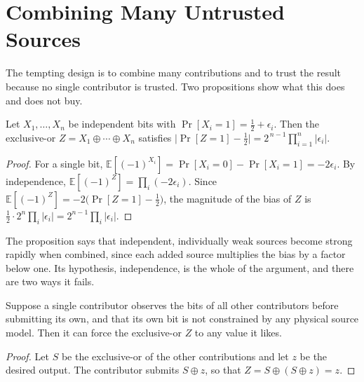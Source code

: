 \section{Combining Many Untrusted Sources}

The tempting design is to combine many contributions and to trust the result because no single contributor is trusted. Two propositions show what this does and does not buy.

\begin{proposition}
\label{prop:piling}
Let $X_1,\dots,X_n$ be independent bits with $\Pr[X_i=1]=\tfrac12+\epsilon_i$. Then the exclusive-or $Z=X_1\oplus\cdots\oplus X_n$ satisfies $\bigl|\Pr[Z=1]-\tfrac12\bigr|=2^{\,n-1}\prod_{i=1}^{n}|\epsilon_i|$.
\end{proposition}

\begin{proof}
For a single bit, $\mathbb E[(-1)^{X_i}]=\Pr[X_i=0]-\Pr[X_i=1]=-2\epsilon_i$. By independence, $\mathbb E[(-1)^{Z}]=\prod_i(-2\epsilon_i)$. Since $\mathbb E[(-1)^Z]=-2\bigl(\Pr[Z=1]-\tfrac12\bigr)$, the magnitude of the bias of $Z$ is $\tfrac12\cdot2^{n}\prod_i|\epsilon_i|=2^{n-1}\prod_i|\epsilon_i|$.
\end{proof}

The proposition says that independent, individually weak sources become strong rapidly when combined, since each added source multiplies the bias by a factor below one. Its hypothesis, independence, is the whole of the argument, and there are two ways it fails.

\begin{proposition}
\label{prop:adaptive}
Suppose a single contributor observes the bits of all other contributors before submitting its own, and that its own bit is not constrained by any physical source model. Then it can force the exclusive-or $Z$ to any value it likes.
\end{proposition}

\begin{proof}
Let $S$ be the exclusive-or of the other contributions and let $z$ be the desired output. The contributor submits $S\oplus z$, so that $Z=S\oplus(S\oplus z)=z$.
\end{proof}

